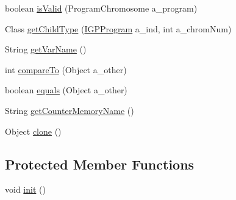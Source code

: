\begin{DoxyCompactItemize}
\item 
boolean \hyperlink{classorg_1_1jgap_1_1gp_1_1function_1_1_for_loop_a867fbd4c0d192343a5a5a4ed00d6dbe8}{is\-Valid} (Program\-Chromosome a\-\_\-program)
\item 
Class \hyperlink{classorg_1_1jgap_1_1gp_1_1function_1_1_for_loop_a9a6d32798ee6750cbfaa4e71773bd849}{get\-Child\-Type} (\hyperlink{interfaceorg_1_1jgap_1_1gp_1_1_i_g_p_program}{I\-G\-P\-Program} a\-\_\-ind, int a\-\_\-chrom\-Num)
\item 
String \hyperlink{classorg_1_1jgap_1_1gp_1_1function_1_1_for_loop_ab612dd9f854c1006285df91de7b04cab}{get\-Var\-Name} ()
\item 
int \hyperlink{classorg_1_1jgap_1_1gp_1_1function_1_1_for_loop_ac8fb4e79d26e9b39b94cef5747580863}{compare\-To} (Object a\-\_\-other)
\item 
boolean \hyperlink{classorg_1_1jgap_1_1gp_1_1function_1_1_for_loop_a55f5c0b474b9d9ac0c52596410eb3ff5}{equals} (Object a\-\_\-other)
\item 
String \hyperlink{classorg_1_1jgap_1_1gp_1_1function_1_1_for_loop_a5741fd22c10a5caefa97e0a73fe884b3}{get\-Counter\-Memory\-Name} ()
\item 
Object \hyperlink{classorg_1_1jgap_1_1gp_1_1function_1_1_for_loop_a32416d78f02592516f87a059f7e9f443}{clone} ()
\end{DoxyCompactItemize}
\subsection*{Protected Member Functions}
\begin{DoxyCompactItemize}
\item 
void \hyperlink{classorg_1_1jgap_1_1gp_1_1function_1_1_for_loop_a6f284c243ddafa40aab0ec5e9df1798c}{init} ()
\end{DoxyCompactItemize}
